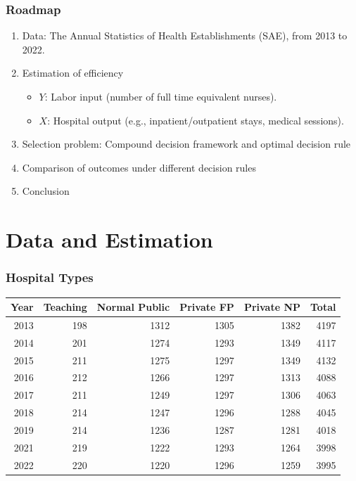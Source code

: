 \documentclass[10pt,mathserif,aspectratio=169]{beamer}
\begin{document}
\begin{frame}
  \frametitle{Roadmap}
  \begin{enumerate}\itemsep=12pt
    \item Data: The Annual Statistics of Health Establishments (SAE), from 2013 to 2022.
    \item Estimation of efficiency
          \begin{itemize} \itemsep=6pt
            \item $Y$: Labor input (number of full time equivalent nurses).
            \item $X$: Hospital output (e.g., inpatient/outpatient stays, medical sessions).
          \end{itemize}
    \item Selection problem: Compound decision framework and optimal decision rule
    \item Comparison of outcomes under different decision rules
    \item Conclusion
  \end{enumerate}
\end{frame}

\section{Data and Estimation}

\begin{frame}
  \frametitle{Hospital Types}
  \begin{table}
    \fontsize{10pt}{10pt}\selectfont
    \begin{tabular}{rrrrrr}
      \toprule
      Year & Teaching & Normal Public & Private FP & Private NP & Total \\
      \midrule
      2013 & 198      & 1312          & 1305       & 1382       & 4197  \\
      2014 & 201      & 1274          & 1293       & 1349       & 4117  \\
      2015 & 211      & 1275          & 1297       & 1349       & 4132  \\
      2016 & 212      & 1266          & 1297       & 1313       & 4088  \\
      2017 & 211      & 1249          & 1297       & 1306       & 4063  \\
      2018 & 214      & 1247          & 1296       & 1288       & 4045  \\
      2019 & 214      & 1236          & 1287       & 1281       & 4018  \\
      2021 & 219      & 1222          & 1293       & 1264       & 3998  \\
      2022 & 220      & 1220          & 1296       & 1259       & 3995  \\
      \bottomrule
    \end{tabular}
  \end{table}
\end{frame}
\end{document}

